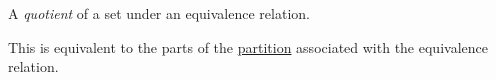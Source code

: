 
A \emph{quotient} of a set under an equivalence relation.

This is equivalent to the parts of the \href{doc/1 math/Seven Sketches in Compositionality/1 Generative Effects/2 What is order/Partition}{partition} associated with the equivalence relation.
